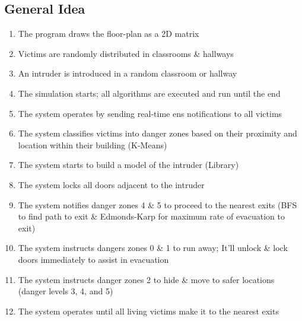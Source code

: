 \documentclass[12pt]{article}
\begin{document}
\subsection*{General Idea}
\begin{enumerate}
\item The program draws the floor-plan as a 2D matrix
\item Victims are randomly distributed in classrooms \& hallways
\item An intruder is introduced in a random classroom or hallway
\item The simulation starts; all algorithms are executed and run until the end
\item The system operates by sending real-time ens notifications to all victims
\item The system classifies victims into danger zones based on their proximity and location within their building (K-Means)
\item The system starts to build a model of the intruder (Library)
\item The system locks all doors adjacent to the intruder
\item The system notifies danger zones 4 \& 5 to proceed to the nearest exits (BFS to find path to exit \& Edmonds-Karp for maximum rate of evacuation to exit)
\item The system instructs dangers zones 0 \& 1 to run away; It'll unlock \& lock doors immediately to assist in evacuation
\item The system instructs danger zones 2 to hide \& move to safer locations (danger levels 3, 4, and 5)
\item The system operates until all living victims make it to the nearest exits
\end{enumerate}
\end{document}
